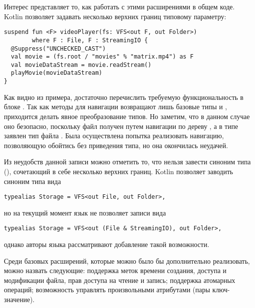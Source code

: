     Интерес представляет то, как работать с этими расширениями в общем коде. Kotlin позволяет задавать несколько верхних границ типовому параметру:
    \begin{verbatim}
suspend fun <F> videoPlayer(fs: VFS<out F, out Folder>)
        where F : File, F : StreamingIO {
  @Suppress("UNCHECKED_CAST")
  val movie = (fs.root / "movies" % "matrix.mp4") as F
  val movieDataStream = movie.readStream()
  playMovie(movieDataStream)
}
    \end{verbatim}
    Как видно из примера, достаточно перечислить требуемую функциональность в блоке . Так как методы для навигации возвращают лишь базовые типы  и , приходится делать явное преобразование типов. Но заметим, что в данном случае оно безопасно, поскольку файл  получен путем навигации по дереву , а в типе  заявлен тип файла . Была осуществлена попытка реализовать навигацию, позволяющую обойтись без приведения типа, но она окончилась неудачей.

    Из неудобств данной записи можно отметить то, что нельзя завести синоним типа (), сочетающий в себе несколько верхних границ. Kotlin позволяет заводить синоним типа вида 
    \begin{verbatim}
typealias Storage = VFS<out File, out Folder>,
    \end{verbatim}
    но на текущий момент язык не позволяет записи вида 
    \begin{verbatim}
typealias Storage = VFS<out (File & StreamingIO), out Folder>,
    \end{verbatim}
    однако авторы языка рассматривают\cite{kotlin-intersection-types} добавление такой возможности.

    Среди базовых расширений, которые можно было бы дополнительно реализовать, можно назвать следующие: поддержка меток времени создания, доступа и модификации файла, прав доступа на чтение и запись; поддержка атомарных операций; возможность управлять произвольными атрибутами (пары ключ-значение).


